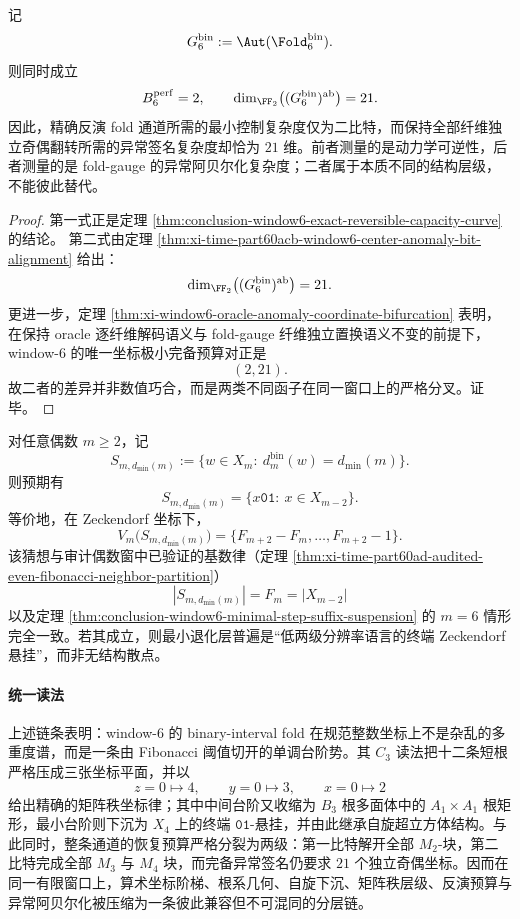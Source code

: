 \begin{theorem}[可逆复杂度与异常复杂度的严格分离]\label{thm:conclusion-window6-inversion-anomaly-strict-separation}
记
\[
G_6^{\mathrm{bin}}:=\Aut(\Fold_6^{\mathrm{bin}}).
\]
则同时成立
\[
B_6^{\mathrm{perf}}=2,
\qquad
\dim_{\FF_2}\bigl((G_6^{\mathrm{bin}})^{\mathrm{ab}}\bigr)=21.
\]
因此，精确反演 fold 通道所需的最小控制复杂度仅为二比特，而保持全部纤维独立奇偶翻转所需的异常签名复杂度却恰为 \(21\) 维。前者测量的是动力学可逆性，后者测量的是 fold-gauge 的异常阿贝尔化复杂度；二者属于本质不同的结构层级，不能彼此替代。
\end{theorem}
\begin{proof}
第一式正是定理 \ref{thm:conclusion-window6-exact-reversible-capacity-curve} 的结论。
第二式由定理 \ref{thm:xi-time-part60acb-window6-center-anomaly-bit-alignment} 给出：
\[
\dim_{\FF_2}\bigl((G_6^{\mathrm{bin}})^{\mathrm{ab}}\bigr)=21.
\]
更进一步，定理 \ref{thm:xi-window6-oracle-anomaly-coordinate-bifurcation} 表明，在保持 oracle 逐纤维解码语义与 fold-gauge 纤维独立置换语义不变的前提下，window-\(6\) 的唯一坐标极小完备预算对正是
\[
(2,21).
\]
故二者的差异并非数值巧合，而是两类不同函子在同一窗口上的严格分叉。证毕。
\end{proof}

\begin{conjecture}[偶数窗最小台阶的终端悬挂]\label{conj:conclusion-even-window-minimal-step-terminal-suspension}
对任意偶数 \(m\ge 2\)，记
\[
S_{m,d_{\min}(m)}:=\{w\in X_m:\ d_m^{\mathrm{bin}}(w)=d_{\min}(m)\}.
\]
则预期有
\[
S_{m,d_{\min}(m)}
=
\{x\mathtt{01}:\ x\in X_{m-2}\}.
\]
等价地，在 Zeckendorf 坐标下，
\[
V_m\bigl(S_{m,d_{\min}(m)}\bigr)
=
\{F_{m+2}-F_m,\dots,F_{m+2}-1\}.
\]
该猜想与审计偶数窗中已验证的基数律（定理 \ref{thm:xi-time-part60ad-audited-even-fibonacci-neighbor-partition}）
\[
|S_{m,d_{\min}(m)}|=F_m=|X_{m-2}|
\]
以及定理 \ref{thm:conclusion-window6-minimal-step-suffix-suspension} 的 \(m=6\) 情形完全一致。若其成立，则最小退化层普遍是“低两级分辨率语言的终端 Zeckendorf 悬挂”，而非无结构散点。
\end{conjecture}

\paragraph{统一读法}
上述链条表明：window-\(6\) 的 binary-interval fold 在规范整数坐标上不是杂乱的多重度谱，而是一条由 Fibonacci 阈值切开的单调台阶势。其 \(C_3\) 读法把十二条短根严格压成三张坐标平面，并以
\[
z=0\mapsto 4,\qquad y=0\mapsto 3,\qquad x=0\mapsto 2
\]
给出精确的矩阵秩坐标律；其中中间台阶又收缩为 \(B_3\) 根多面体中的 \(A_1\times A_1\) 根矩形，最小台阶则下沉为 \(X_4\) 上的终端 \(\mathtt{01}\)-悬挂，并由此继承自旋超立方体结构。与此同时，整条通道的恢复预算严格分裂为两级：第一比特解开全部 \(M_2\)-块，第二比特完成全部 \(M_3\) 与 \(M_4\) 块，而完备异常签名仍要求 \(21\) 个独立奇偶坐标。因而在同一有限窗口上，算术坐标阶梯、根系几何、自旋下沉、矩阵秩层级、反演预算与异常阿贝尔化被压缩为一条彼此兼容但不可混同的分层链。

\endinput

